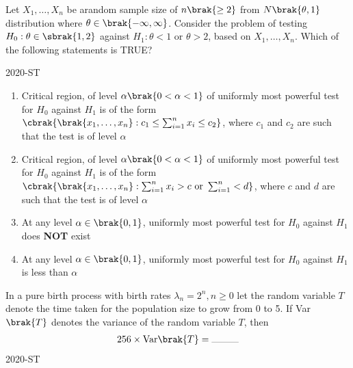 

\iffalse
		\author{ai24btech11036}
		\section{st}
		\chapter{2020}
		\fi

\item Let $X_{1}, \ldots, X_{n}$ be arandom sample size of $n\brak{\geq 2}$ from $N\brak{\theta, 1}$ distribution where $\theta \in \brak{-\infty, \infty}$. Consider the problem of testing $H_{0}: \theta \in \sbrak{1,2}$ against $H_{1}: \theta < 1$ or $\theta > 2$, based on $X_{1}, \ldots, X_{n}$. Which of the following statements is TRUE?

	\hfill{2020-ST}
	\begin{enumerate}
	\item Critical region, of level $\alpha \brak{0<\alpha<1}$ of uniformly most powerful test for $H_{0}$ against $H_{1}$ is of the form $\cbrak{\brak{x_{1}, \ldots, x_{n}}: c_{1} \leq \sum_{i=1}^{n}x_{i} \leq c_{2}}$, where $c_{1}$ and $c_{2}$ are such that the test is of level $\alpha$
	\item Critical region, of level $\alpha \brak{0<\alpha<1}$ of uniformly most powerful test for $H_{0}$ against $H_{1}$ is of the form $\cbrak{\brak{x_{1}, \ldots, x_{n}}: \sum_{i=1}^{n}x_{i}>c \text{ or } \sum_{i=1}^{n}<d}$, where $c$ and $d$ are such that the test is of level $\alpha$
	\item At any level $\alpha \in \brak{0,1}$, uniformly most powerful test for $H_{0}$ against $H_{1}$ does \textbf{NOT} exist
	\item At any level $\alpha \in \brak{0,1}$, uniformly most powerful test for $H_{0}$ against $H_{1}$ is less than $\alpha$	
	\end{enumerate}

\item In a pure birth process with birth rates $\lambda_{n}=2^{n}, n \geq 0$ let the random variable $T$ denote the time taken for the population size to grow from 0 to 5. If Var$\brak{T}$ denotes the variance of the random variable $T$, then
	\begin{align*}
	 	256 \times \text{Var}\brak{T}= \rule{1cm}{0.2pt}
	\end{align*}
\hfill{2020-ST}


